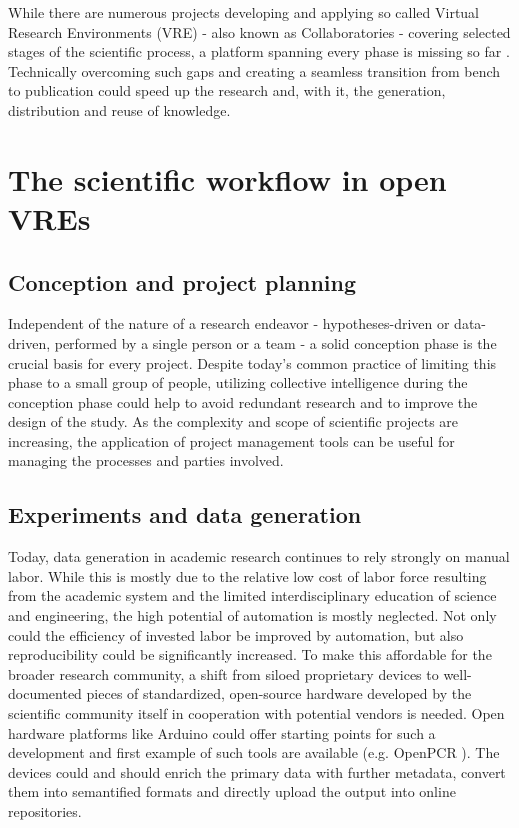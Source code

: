 \documentclass{llncs}
\begin{document}
While there are numerous projects developing and applying so called
Virtual Research Environments (VRE) - also known as Collaboratories -
covering selected stages of the scientific process, a platform
spanning every phase is missing so far \cite{Carusi}. Technically
overcoming such gaps and creating a seamless transition from bench to
publication could speed up the research and, with it, the generation,
distribution and reuse of knowledge.

\section{The scientific workflow in open VREs}

\subsection{Conception and project planning}

Independent of the nature of a research endeavor - hypotheses-driven
or data-driven, performed by a single person or a team - a solid
conception phase is the crucial basis for every project. Despite
today's common practice of limiting this phase to a small group of
people, utilizing collective intelligence during the conception phase
could help to avoid redundant research and to improve the design of
the study. As the complexity and scope of scientific projects are
increasing, the application of project management tools can be useful
for managing the processes and parties involved.

\subsection{Experiments and data generation}

Today, data generation in academic research continues to rely strongly
on manual labor. While this is mostly due to the relative low cost of
labor force resulting from the academic system and the limited
interdisciplinary education of science and engineering, the high
potential of automation is mostly neglected. Not only could the
efficiency of invested labor be improved by automation, but also
reproducibility could be significantly increased. To make this
affordable for the broader research community, a shift from siloed
proprietary devices to well-documented pieces of standardized,
open-source hardware developed by the scientific community itself in
cooperation with potential vendors is needed. Open hardware platforms
like Arduino \cite{Arduino} could offer starting points for such a
development and first example of such tools are available
(e.g. OpenPCR \cite{OpenPCR}). The devices could and should enrich the
primary data with further metadata, convert them into semantified
formats and directly upload the output into online repositories.\\
\end{document}

